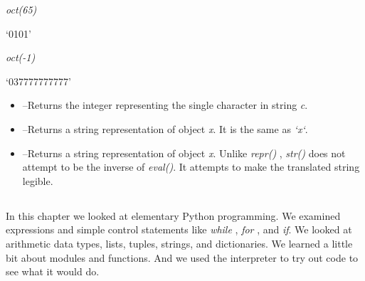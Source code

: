 \emph{oct(65)}

`0101'


\emph{oct(-1)}

`037777777777'

\begin{itemize}

\item
   --Returns the
  integer representing the single character in string \emph{c}.
\item
   --Returns a
  string representation of object \emph{x}. It is the same as
  \emph{`x`}.
\item
   --Returns a string
  representation of object \emph{x}. Unlike \emph{repr()} ,
  \emph{str()} does not attempt to be the inverse of \emph{eval()}. It
  attempts to make the translated string legible.
\end{itemize}

\subsection[Summary]{}

In this chapter we looked at
elementary Python programming. We examined expressions and simple
control statements like \emph{while} , \emph{for} , and \emph{if}. We
looked at arithmetic data types, lists, tuples, strings, and
dictionaries. We learned a little bit about modules and functions. And
we used the interpreter to try out code to see what it would do.

~

